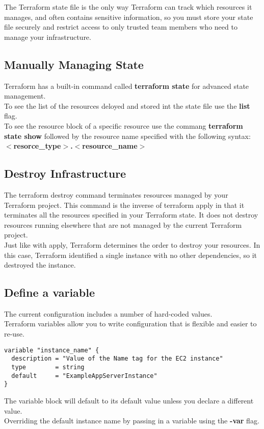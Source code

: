 \documentclass[12pt, letterpaper, twoside]{article}
\begin{document}
The Terraform state file is the only way Terraform can track which resources it manages, 
and often contains sensitive information, so you must store your state file securely and 
restrict access to only trusted team members who need to manage your infrastructure.\\

\subsection{Manually Managing State}
Terraform has a built-in command called \textbf{terraform state} for advanced state management.\\
To see the list of the resources deloyed and stored int the state file use the 
\textbf{list} flag.\\
To see the resource block of a specific resource use the commang \textbf{terraform state show}
followed by the resource name specified with the following syntax:\\
\textbf{$<$resorce\_type$>$.$<$resource\_name$>$}

\subsection{Destroy Infrastructure}
The terraform destroy command terminates resources managed by your Terraform project. 
This command is the inverse of terraform apply in that it terminates all the resources 
specified in your Terraform state. It does not destroy resources running elsewhere that 
are not managed by the current Terraform project.\\
Just like with apply, Terraform determines the order to destroy your resources. 
In this case, Terraform identified a single instance with no other dependencies, 
so it destroyed the instance. 

\subsection{Define a variable}
The current configuration includes a number of hard-coded values.\\
Terraform variables allow you to write configuration that is flexible and easier to re-use.
\begin{verbatim}
variable "instance_name" {
  description = "Value of the Name tag for the EC2 instance"
  type        = string
  default     = "ExampleAppServerInstance"
}
\end{verbatim}
The variable block will default to its default value unless you declare a different value.\\
Overriding the default instance name by passing in a variable using the \textbf{-var} flag.\\
\end{document}
